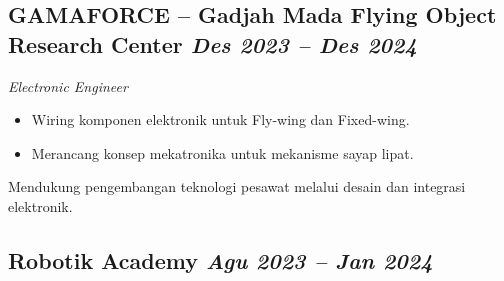 \documentclass[a4paper,11pt]{article}
\begin{document}
	\subsection*{GAMAFORCE – Gadjah Mada Flying Object Research Center \hfill \textnormal{\textit{Des 2023 – Des 2024}}}
	\textit{Electronic Engineer}
	\begin{itemize}
		\item Wiring komponen elektronik untuk Fly-wing dan Fixed-wing.
		\item Merancang konsep mekatronika untuk mekanisme sayap lipat.
	\end{itemize}
	\noindent Mendukung pengembangan teknologi pesawat melalui desain dan integrasi elektronik.\\
	
	\subsection*{Robotik Academy \hfill \textnormal{\textit{Agu 2023 – Jan 2024}}}
\end{document}

